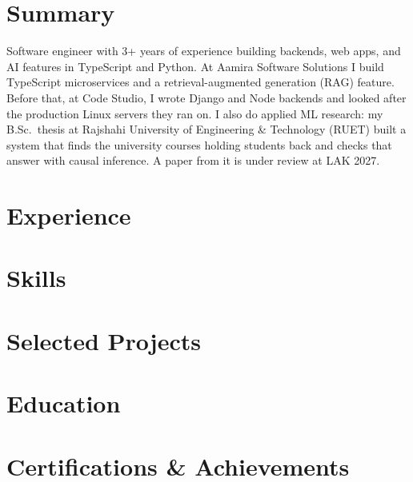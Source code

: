 \documentclass[10pt, a4paper]{article}
\begin{document}
\color{primary}
\cvheader

\section{Summary}
Software engineer with 3+ years of experience building backends, web apps, and AI features in TypeScript and Python. At Aamira Software Solutions I build TypeScript microservices and a retrieval-augmented generation (RAG) feature. Before that, at Code Studio, I wrote Django and Node backends and looked after the production Linux servers they ran on. I also do applied ML research: my B.Sc.\ thesis at Rajshahi University of Engineering \& Technology (RUET) built a system that finds the university courses holding students back and checks that answer with causal inference. A paper from it is under review at LAK 2027.

\section{Experience}




\section{Skills}


\section{Selected Projects}



\section{Education}
\def\eduthesisline{}


\section{Certifications \& Achievements}
\def\certindustry{}

\end{document}
